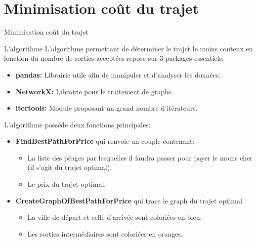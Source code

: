 \documentclass{beamer}
\begin{document}
\section{Minimisation coût du trajet}
\begin{frame}{Minimisation coût du trajet}
		\begin{block}{\scriptsize L'algorithme}
			\scriptsize
			L'algorithme permettant de déterminer le trajet le moins couteux en fonction du nombre de sorties acceptées repose sur 3 packages essentiels:
			\begin{itemize}
				\item \textbf{pandas:} Librairie utile afin de manipuler et d'analyser les données.
				\item \textbf{NetworkX:} Librairie pour le traitement de graphs.
				\item \textbf{itertools:} Module proposant un grand nombre d'itérateurs.
			\end{itemize}
			\vspace{3mm}
			L'algorithme possède deux fonctions principales:
			\begin{itemize}
				\item \textbf{FindBestPathForPrice} qui renvoie un couple contenant:
				\begin{itemize}
					\scriptsize
					\item La liste des péages par lesquelles il faudra passer pour payer le moins cher (il s'agit du trajet optimal).
					\item Le prix du trajet optimal.
				\end{itemize}
				\item \textbf{CreateGraphOfBestPathForPrice} qui trace le graph du trajet optimal.
				\begin{itemize}
					\scriptsize
					\item La ville de départ et celle d'arrivée sont coloriées en bleu.
					\item Les sorties intermédiaires sont coloriées en oranges.
				\end{itemize}
			\end{itemize}
		\end{block}
		
	\end{frame}
\end{document}
